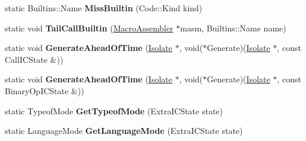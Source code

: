 \begin{DoxyCompactItemize}
\item 
static Builtins\+::\+Name {\bfseries Miss\+Builtin} (Code\+::\+Kind kind)\hypertarget{classv8_1_1internal_1_1_b_a_s_e___e_m_b_e_d_d_e_d_a0f7003dbc83db5004fb4146f3277373c}{}\label{classv8_1_1internal_1_1_b_a_s_e___e_m_b_e_d_d_e_d_a0f7003dbc83db5004fb4146f3277373c}

\item 
static void {\bfseries Tail\+Call\+Builtin} (\hyperlink{classv8_1_1internal_1_1_macro_assembler}{Macro\+Assembler} $\ast$masm, Builtins\+::\+Name name)\hypertarget{classv8_1_1internal_1_1_b_a_s_e___e_m_b_e_d_d_e_d_adbc31cf9fa18ce7b4e646edc79095b62}{}\label{classv8_1_1internal_1_1_b_a_s_e___e_m_b_e_d_d_e_d_adbc31cf9fa18ce7b4e646edc79095b62}

\item 
static void {\bfseries Generate\+Ahead\+Of\+Time} (\hyperlink{classv8_1_1internal_1_1_isolate}{Isolate} $\ast$, void($\ast$Generate)(\hyperlink{classv8_1_1internal_1_1_isolate}{Isolate} $\ast$,                                                                                                                                                                                                   const Call\+I\+C\+State \&))\hypertarget{classv8_1_1internal_1_1_b_a_s_e___e_m_b_e_d_d_e_d_acb7aae01db8b90d3a97642502cb040ca}{}\label{classv8_1_1internal_1_1_b_a_s_e___e_m_b_e_d_d_e_d_acb7aae01db8b90d3a97642502cb040ca}

\item 
static void {\bfseries Generate\+Ahead\+Of\+Time} (\hyperlink{classv8_1_1internal_1_1_isolate}{Isolate} $\ast$, void($\ast$Generate)(\hyperlink{classv8_1_1internal_1_1_isolate}{Isolate} $\ast$,                                                                                                                                                                                                   const Binary\+Op\+I\+C\+State \&))\hypertarget{classv8_1_1internal_1_1_b_a_s_e___e_m_b_e_d_d_e_d_ae9e0b8120c1242c245b2b908a90797b9}{}\label{classv8_1_1internal_1_1_b_a_s_e___e_m_b_e_d_d_e_d_ae9e0b8120c1242c245b2b908a90797b9}

\item 
static Typeof\+Mode {\bfseries Get\+Typeof\+Mode} (Extra\+I\+C\+State state)\hypertarget{classv8_1_1internal_1_1_b_a_s_e___e_m_b_e_d_d_e_d_a38c1c3d7aa950469a1b613fa2e01db9e}{}\label{classv8_1_1internal_1_1_b_a_s_e___e_m_b_e_d_d_e_d_a38c1c3d7aa950469a1b613fa2e01db9e}

\item 
static Language\+Mode {\bfseries Get\+Language\+Mode} (Extra\+I\+C\+State state)\hypertarget{classv8_1_1internal_1_1_b_a_s_e___e_m_b_e_d_d_e_d_abe30f711d22cff8b3f4825356c17a6a7}{}\label{classv8_1_1internal_1_1_b_a_s_e___e_m_b_e_d_d_e_d_abe30f711d22cff8b3f4825356c17a6a7}


\end{DoxyCompactItemize}
